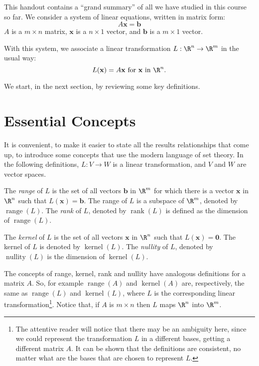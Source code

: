 \documentclass[12pt]{article}
\DeclareMathOperator{\range}{range}
\DeclareMathOperator{\rank}{rank}
\DeclareMathOperator{\kernel}{kernel}
\DeclareMathOperator{\nullity}{nullity}
\begin{document}
This handout contains a ``grand summary'' of all we have studied in this course so far. We consider a system of linear equations, written in matrix form:
\[
A\mathbf{x}=\mathbf{b}
\]
$A$ is a $m\times n$ matrix, $\mathbf{x}$ is a $n\times 1$ vector, and $\mathbf{b}$ is a $m\times1$ vector.

With this system, we associate a linear transformation $L:\R^n\to \R^m$ in the usual way:
\[
L(\mathbf{x})=A\mathbf{x}\text{ for $\mathbf{x}$ in $\R^n$.}
\]

We start, in the next section, by reviewing some key definitions.

\section{Essential Concepts}

It is convenient, to make it easier to state all the results relationships that come up, to introduce some concepts that use the modern language of set theory. In the following definitions, $L:V\to W$ is a linear transformation, and $V$ and $W$ are vector spaces.

\begin{definition} The \emph{range} of $L$ is the set of all vectors $\mathbf{b}$ in $\R^m$ for which there is a vector $\mathbf{x}$ in $\R^n$ such that $L(\mathbf{x})=\mathbf{b}$.
The range of $L$ is a subspace of $\R^m$, denoted by $\range(L)$. The \emph{rank} of $L$, denoted by $\rank(L)$ is defined as the dimension of $\range(L)$.
\end{definition}

\begin{definition} The \emph{kernel} of $L$ is the set of all vectors $\mathbf{x}$ in $\R^n$ such that $L(\mathbf{x})=\mathbf{0}$. The kernel of $L$ is denoted by $\kernel(L)$. The \emph{nullity} of $L$, denoted by $\nullity(L)$ is the dimension of $\kernel(L)$.
\end{definition}

The concepts of range, kernel, rank and nullity have analogous definitions for a matrix $A$. So, for example $\range(A)$ and $\kernel(A)$ are, respectively, the same as $\range(L)$ and $\kernel(L)$, where $L$ is the corresponding linear transformation\footnote{The attentive reader will notice that there may be an ambiguity here, since we could represent the transformation $L$ in a different bases, getting a different matrix $A$. It can be shown that the definitions are consistent, no matter what are the bases that are chosen to represent $L$.}. Notice that, if $A$ is $m\times n$ then $L$ maps $\R^n$ into $\R^m$.
\end{document}
